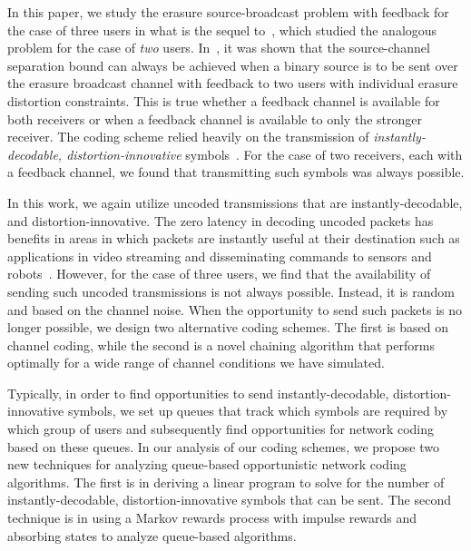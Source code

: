 In this paper, we study the erasure source-broadcast problem with feedback for the case of three users in what is the sequel to~\cite{TMKS_TIT20}, which studied the analogous problem for the case of \emph{two} users.  In~\cite{TMKS_TIT20}, it was shown that the source-channel separation bound can always be achieved when a binary source is to be sent over the erasure broadcast channel with feedback to two users with individual erasure distortion constraints.  This is true whether a feedback channel is available for both receivers or when a feedback channel is available to only the stronger receiver.  The coding scheme relied heavily on the transmission of \emph{instantly-decodable, distortion-innovative} symbols~\cite{TMKS_TIT20,SorourValaee15,SorourValaee10}.  For the case of two receivers, each with a feedback channel, we found that transmitting such symbols was always possible.  

In this work, we again utilize uncoded transmissions that are instantly-decodable, and distortion-innovative.  The zero latency in decoding uncoded packets has benefits in areas in which packets are instantly useful at their destination such as applications in video streaming and disseminating commands to sensors and robots~\cite{SorourValaee15,SorourValaee10}.
However, for the case of three users, we find that the availability of sending such uncoded transmissions is not always possible.  Instead, it is random and based on the channel noise.  When the opportunity to send such packets is no longer possible, we design two alternative coding schemes.  The first is based on channel coding, while the second is a novel chaining algorithm that performs optimally for a wide range of channel conditions we have simulated.

Typically, in order to find opportunities to send instantly-decodable, distortion-innovative symbols, we set up queues that track which symbols are required by which group of users and subsequently find opportunities for network coding based on these queues.  In our analysis of our coding schemes, we propose two new techniques for analyzing queue-based opportunistic network coding algorithms. The first is in deriving a linear program to solve for the number of instantly-decodable, distortion-innovative symbols that can be sent. The second technique is in using a Markov rewards process with impulse rewards and absorbing states to analyze queue-based algorithms.

